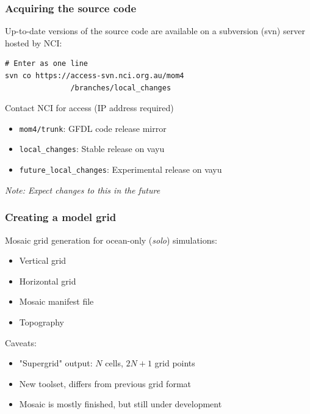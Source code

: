 \documentclass[red]{beamer}
\begin{document}
\begin{frame}[fragile]
    \frametitle{Acquiring the source code}
    
    Up-to-date versions of the source code are available on a subversion (svn)
    server hosted by NCI:
    
    \begin{lstlisting}
# Enter as one line
svn co https://access-svn.nci.org.au/mom4
               /branches/local_changes
    \end{lstlisting}
    Contact NCI for access (IP address required)
    
    \begin{itemize}
        \item \lstinline|mom4/trunk|: GFDL code release mirror
        \item \lstinline|local_changes|: Stable release on vayu
        \item \lstinline|future_local_changes|: Experimental release on vayu
    \end{itemize}
    
    \textit{Note: Expect changes to this in the future}
\end{frame}

\begin{frame}
    \frametitle{Creating a model grid}
    
    Mosaic grid generation for ocean-only (\textit{solo}) simulations:
    \begin{itemize}
        \item Vertical grid
        \item Horizontal grid
        \item Mosaic manifest file
        \item Topography
    \end{itemize}
    
    Caveats:
    \begin{itemize}
        \item "Supergrid" output: $N$ cells, $2N+1$ grid points
        \item New toolset, differs from previous grid format
        \item Mosaic is mostly finished, but still under development
    \end{itemize}
\end{frame}
\end{document}
